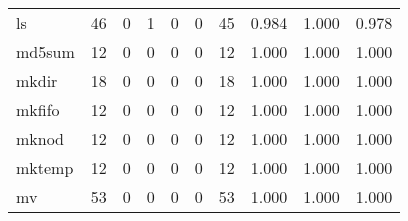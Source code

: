 \begin{longtable}{lp{1.3cm}p{1.3cm}p{1.3cm}p{1.3cm}p{1.3cm}p{1.3cm}p{1.3cm}p{1.3cm}p{1.3cm}}
ls        &                     46 &                                             0 &                                            1 &                                           0 &                                            0 &                                         45 &                                0.984 &                                  1.000 &                                0.978 \\
md5sum    &                     12 &                                             0 &                                            0 &                                           0 &                                            0 &                                         12 &                                1.000 &                                  1.000 &                                1.000 \\
mkdir     &                     18 &                                             0 &                                            0 &                                           0 &                                            0 &                                         18 &                                1.000 &                                  1.000 &                                1.000 \\
mkfifo    &                     12 &                                             0 &                                            0 &                                           0 &                                            0 &                                         12 &                                1.000 &                                  1.000 &                                1.000 \\
mknod     &                     12 &                                             0 &                                            0 &                                           0 &                                            0 &                                         12 &                                1.000 &                                  1.000 &                                1.000 \\
mktemp    &                     12 &                                             0 &                                            0 &                                           0 &                                            0 &                                         12 &                                1.000 &                                  1.000 &                                1.000 \\
mv        &                     53 &                                             0 &                                            0 &                                           0 &                                            0 &                                         53 &                                1.000 &                                  1.000 &                                1.000 \\

\end{longtable}

